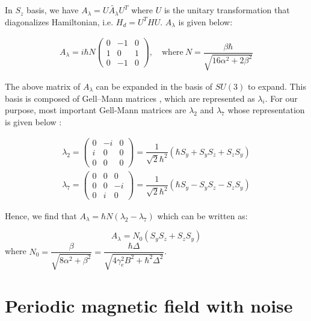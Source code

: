 \documentclass[11pt,a4paper]{article}
\begin{document}
In $S_z$ basis, we have  $A_{\lambda}= U\tilde{A_{\lambda}} U^{T}$ where $U$ is the unitary transformation that diagonalizes Hamiltonian, i.e. $H_d= U^THU$. $A_{\lambda}$ is given below:

\begin{align*}
A_{\lambda}=i\hbar N
\begin{pmatrix}
0 & -1 & 0\\
1 & 0 & 1 \\
0 & -1 & 0
\end{pmatrix}, \quad \mbox{where} ~ N =\dfrac{ \beta \hbar}{\sqrt{16 \alpha^{2} + 2\beta^{2}}}
\end{align*}





The above matrix of $A_{\lambda}$ can be expanded in the basis of $SU(3)$ to expand. This basis is composed of Gell–Mann matrices \cite{gell1962symmetries}, which are represented as $\lambda_i$. For our purpose, most important Gell-Mann matrices are $\lambda_2$ and $\lambda_7$ whose representation is given below \cite{ bertlmann2008bloch, krammer2009entanglement}:

\begin{align*}
\lambda_2 = \begin{pmatrix} 0 & -i & 0 \\ i & 0 & 0 \\ 0 & 0 & 0 \end{pmatrix} 
= \dfrac{1}{\sqrt{2} \hbar^2}(\hbar S_y+ S_y S_z+  S_z S_y)\\
\lambda_7= \begin{pmatrix} 0 & 0 & 0\\0 & 0 & -i \\0 & i & 0\end{pmatrix}= \dfrac{1}{\sqrt{2} \hbar^2}(\hbar S_y- S_y S_z-  S_z S_y)
\end{align*}

Hence, we find that $A_{\lambda}=\hbar N(\lambda_2- \lambda_7)$ which can be written as:

\begin{equation}
\boxed{
A_{\lambda}=N_0(S_y S_z+  S_z S_y)}
\end{equation}
where $N_0 =\dfrac{ \beta }{\sqrt{8 \alpha^{2} + \beta^{2}}}= \dfrac{\hbar \Delta }{ \sqrt{4  \gamma_e^2 B^2 + \hbar^2 \Delta^2}}$.



 
\section{Periodic magnetic field with noise}
\end{document}
